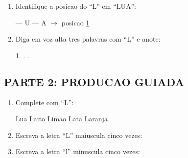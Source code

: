 \begin{exercicio}
\begin{enumerate}
  \item Identifique a posicao do ``L'' em ``LUA'':
  \begin{center}
   --- U --- A $\rightarrow$ posicao \underline{1}
  \end{center}

  \item Diga em voz alta tres palavras com ``L'' e anote:
  \begin{center}
  1. \underline{\hspace{4cm}} . \underline{\hspace{4cm}} . \underline{\hspace{4cm}}
  \end{center}
\end{enumerate}

\subsection*{PARTE 2: PRODUCAO GUIADA}

\begin{enumerate}[resume]
  \item Complete com ``L'':
  \begin{center}
  \underline{L}ua \quad \underline{L}aito \quad \underline{L}imao \quad \underline{L}ata \quad \underline{L}aranja
  \end{center}

  \item Escreva a letra ``L'' maiuscula cinco vezes:
  \begin{center}
  \underline{\hspace{1.5cm}} \quad \underline{\hspace{1.5cm}} \quad \underline{\hspace{1.5cm}} \quad \underline{\hspace{1.5cm}} \quad \underline{\hspace{1.5cm}}
  \end{center}

  \item Escreva a letra ``l'' minuscula cinco vezes:
  \begin{center}
  \underline{\hspace{1.5cm}} \quad \underline{\hspace{1.5cm}} \quad \underline{\hspace{1.5cm}} \quad \underline{\hspace{1.5cm}} \quad \underline{\hspace{1.5cm}}
  \end{center}


\end{enumerate}
\end{exercicio}
